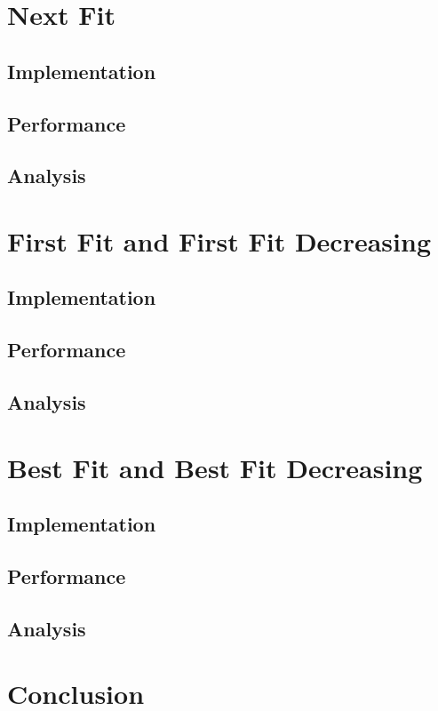 \documentclass{article}
\begin{document}
\section{Next Fit}
\subsection{Implementation}
\subsection{Performance}
\subsection{Analysis}

\section{First Fit and First Fit Decreasing}
\subsection{Implementation}
\subsection{Performance}
\subsection{Analysis}

\section{Best Fit and Best Fit Decreasing}
\subsection{Implementation}
\subsection{Performance}
\subsection{Analysis}

\section{Conclusion}
\end{document}

